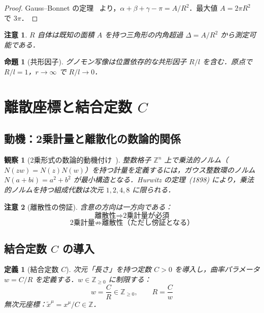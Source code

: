 \documentclass[12pt,a4paper]{ltjsarticle}
\newtheorem{proposition}[theorem]{命題}
\newtheorem{definition}[theorem]{定義}
\newtheorem*{remark}{注意}
\newtheorem*{observation}{観察}
\begin{document}
\begin{proof}
Gauss--Bonnet の定理~\cite{doCarmo1992} より，$\alpha + \beta + \gamma - \pi = A/R^2$．最大値 $A = 2\pi R^2$ で $3\pi$．
\end{proof}

\begin{remark}
$R$ 自体は既知の面積 $A$ を持つ三角形の内角超過 $\Delta = A/R^2$ から測定可能である．
\end{remark}

\begin{proposition}[共形因子]
グノモン写像は位置依存的な共形因子 $R/l$ を含む．原点で $R/l = 1$，$r \to \infty$ で $R/l \to 0$．
\end{proposition}

\section{離散座標と結合定数 $C$}

\subsection{動機：2乗計量と離散化の数論的関係}

\begin{observation}[2乗形式の数論的動機付け~{\normalfont\cite{Hurwitz1898}}]
整数格子 $\mathbb{Z}^n$ 上で乗法的ノルム（$N(zw) = N(z)N(w)$）を持つ計量を定義するには，ガウス整数環のノルム $N(a+bi) = a^2 + b^2$ が最小構造となる．Hurwitz の定理~(1898) により，乗法的ノルムを持つ組成代数は次元 $1, 2, 4, 8$ に限られる．
\end{observation}

\begin{remark}[離散性の傍証]
含意の方向は一方向である：
\[
\text{離散性} \Longrightarrow \text{2乗計量が必須}
\]
\[
\text{2乗計量} \not\Longrightarrow \text{離散性（ただし傍証となる）}
\]
\end{remark}

\subsection{結合定数 $C$ の導入}

\begin{definition}[結合定数 $C$]\label{def:C}
次元「長さ」を持つ定数 $C > 0$ を導入し，曲率パラメータ $w = C/R$ を定義する．$w \in \mathbb{Z}_{\geq 0}$ に制限する：
\begin{equation}
w = \frac{C}{R} \in \mathbb{Z}_{\geq 0}, \qquad R = \frac{C}{w} \tag{6.1}
\end{equation}
無次元座標：$\tilde{x}^\mu = x^\mu / C \in \mathbb{Z}$．
\end{definition}
\end{document}
